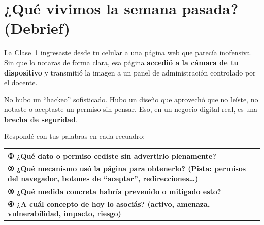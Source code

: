 \documentclass[12pt,a4paper]{article}
\begin{document}
\tableofcontents
\newpage

\section{¿Qué vivimos la semana pasada? (Debrief)}

La Clase~1 ingresaste desde tu celular a una página web que parecía inofensiva.
Sin que lo notaras de forma clara, esa página \textbf{accedió a la cámara de tu
dispositivo} y transmitió la imagen a un panel de administración controlado por
el docente.

\begin{cajaReflexion}
No hubo un ``hackeo'' sofisticado. Hubo un diseño que aprovechó que no leíste,
no notaste o aceptaste un permiso sin pensar. Eso, en un negocio digital real,
es una \textbf{brecha de seguridad}.
\end{cajaReflexion}

\begin{cajaActividad}[title={\ding{45}\; Actividad individual — Completá durante la clase}]
Respondé con tus palabras en cada recuadro:

\vspace{6pt}
\begin{tabularx}{\textwidth}{|>{\bfseries}p{}|X|}
\hline
\textbf{① ¿Qué dato o permiso cediste sin advertirlo plenamente?} & \\[2.5cm]
\hline
\textbf{② ¿Qué mecanismo usó la página para obtenerlo?} \newline
\footnotesize{(Pista: permisos del navegador, botones de ``aceptar'', redirecciones\ldots)} & \\[2.5cm]
\hline
\textbf{③ ¿Qué medida concreta habría prevenido o mitigado esto?} & \\[2.5cm]
\hline
\textbf{④ ¿A cuál concepto de hoy lo asociás?} \newline
\footnotesize{(activo, amenaza, vulnerabilidad, impacto, riesgo)} & \\[2.5cm]
\hline
\end{tabularx}
\end{cajaActividad}

\newpage
\end{document}
